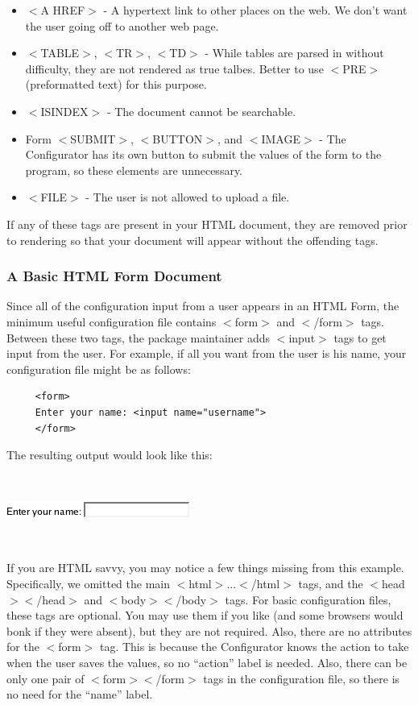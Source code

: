 \begin{itemize}
\item $<$A HREF$>$ - A hypertext link to other places on the web. We don't want
the user going off to another web page.
\item $<$TABLE$>$, $<$TR$>$, $<$TD$>$ - While tables are parsed in without difficulty,
they are not rendered as true talbes. Better to use $<$PRE$>$ (preformatted
text) for this purpose.
\item $<$ISINDEX$>$ - The document cannot be searchable.
\item Form $<$SUBMIT$>$, $<$BUTTON$>$, and $<$IMAGE$>$ - The Configurator has its own
button to submit the values of the form to the program, so these elements
are unnecessary.
\item $<$FILE$>$ - The user is not allowed to upload a file. 
\end{itemize}
If any of these tags are present in your HTML document, they are removed
prior to rendering so that your document will appear without the offending
tags.


\subsubsection*{A Basic HTML Form Document}

Since all of the configuration input from a user appears in an HTML
Form, the minimum useful configuration file contains $<$form$>$ and
$<$/form$>$
tags. Between these two tags, the package maintainer adds $<$input$>$
tags to get input from the user. For example, if all you want from
the user is his name, your configuration file might be as follows:

\begin{footnotesize}
\begin{verbatim}
     <form>
     Enter your name: <input name="username">
     </form>
\end{verbatim}
\end{footnotesize}

The resulting output would look like this:

~

\includegraphics[scale=0.5]{figs/EnterYourName}


~


If you are HTML savvy, you may notice a few things missing from this
example. Specifically, we omitted the main $<$html$>$...$<$/html$>$ tags,
and the $<$head$>$$<$/head$>$ and $<$body$>$$<$/body$>$ tags. For basic configuration
files, these tags are optional. You may use them if you like (and
some browsers would bonk if they were absent), but they are not required.
Also, there are no attributes for the $<$form$>$ tag. This is because
the Configurator knows the action to take when the user saves the
values, so no {}``action'' label is needed. Also, there can be only
one pair of $<$form$>$$<$/form$>$ tags in the configuration file, so there
is no need for the {}``name'' label.


